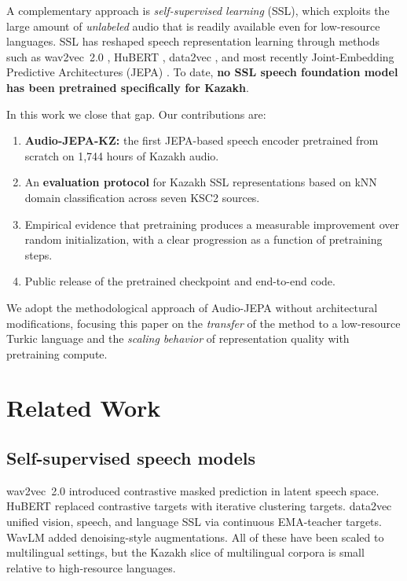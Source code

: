 \documentclass[conference]{IEEEtran}
\begin{document}
A complementary approach is \emph{self-supervised learning} (SSL), which exploits the large amount of \emph{unlabeled} audio that is readily available even for low-resource languages. SSL has reshaped speech representation learning through methods such as wav2vec~2.0 \cite{baevski2020wav2vec2}, HuBERT \cite{hsu2021hubert}, data2vec \cite{baevski2022data2vec}, and most recently Joint-Embedding Predictive Architectures (JEPA) \cite{assran2023ijepa,bardes2024vjepa,tuncay2025audiojepa}. To date, \textbf{no SSL speech foundation model has been pretrained specifically for Kazakh}.

In this work we close that gap. Our contributions are:

\begin{enumerate}
    \item \textbf{Audio-JEPA-KZ:} the first JEPA-based speech encoder pretrained from scratch on 1{,}744 hours of Kazakh audio.
    \item An \textbf{evaluation protocol} for Kazakh SSL representations based on kNN domain classification across seven KSC2 sources.
    \item Empirical evidence that pretraining produces a measurable improvement over random initialization, with a clear progression as a function of pretraining steps.
    \item Public release of the pretrained checkpoint and end-to-end code.
\end{enumerate}

We adopt the methodological approach of Audio-JEPA without architectural modifications, focusing this paper on the \emph{transfer} of the method to a low-resource Turkic language and the \emph{scaling behavior} of representation quality with pretraining compute.

\section{Related Work}

\subsection{Self-supervised speech models}

wav2vec~2.0 \cite{baevski2020wav2vec2} introduced contrastive masked prediction in latent speech space. HuBERT \cite{hsu2021hubert} replaced contrastive targets with iterative clustering targets. data2vec \cite{baevski2022data2vec} unified vision, speech, and language SSL via continuous EMA-teacher targets. WavLM \cite{chen2022wavlm} added denoising-style augmentations. All of these have been scaled to multilingual settings, but the Kazakh slice of multilingual corpora is small relative to high-resource languages.
\end{document}
